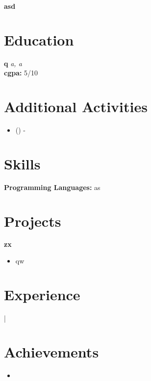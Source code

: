 \documentclass[10pt, letterpaper]{article}
\newenvironment{onecolentry}{}{} %
\newenvironment{highlights}{\begin{itemize}}{\end{itemize}} %
\begin{document}
\begin{center}
    {\LARGE\bfseries asd}\\[5pt]
    {}
\end{center}

\section{Education}
\begin{onecolentry}
    \textbf{q} 
    \textit{a, a}\\
    \textbf{cgpa:} 5/10
\end{onecolentry}

\section{Additional Activities}
\begin{onecolentry}
    \begin{highlights}
        \item \textbf{} () - 
    \end{highlights}
\end{onecolentry}

\section{Skills}
\textbf{Programming Languages:} as\\




\section{Projects}
\begin{onecolentry}
    {\textbf{\large zx}}
    \begin{itemize}
        \item qw
    \end{itemize}
\end{onecolentry}
\vspace{7pt}

\section{Experience}
\begin{onecolentry}
    \textbf{} \hfill  | 
\end{onecolentry}

\section{Achievements}
\begin{onecolentry}
    \begin{itemize}
        \item 
    \end{itemize}
\end{onecolentry}
\end{document}

